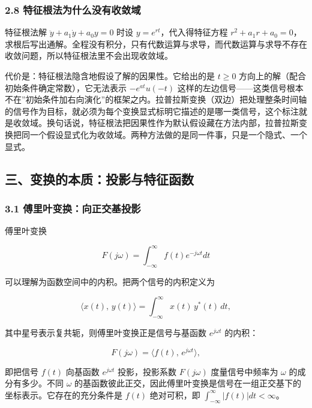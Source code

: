 \documentclass[12pt]{ctexart}
\begin{document}
\hypertarget{ux7279ux5f81ux6839ux6cd5ux4e3aux4ec0ux4e48ux6ca1ux6709ux6536ux655bux57df}{%
\subsubsection{2.8
特征根法为什么没有收敛域}\label{ux7279ux5f81ux6839ux6cd5ux4e3aux4ec0ux4e48ux6ca1ux6709ux6536ux655bux57df}}

特征根法解 \(\ddot y+a_1\dot y+a_0 y=0\) 时设
\(y=e^{rt}\)，代入得特征方程
\(r^2+a_1 r+a_0=0\)，求根后写出通解。全程没有积分，只有代数运算与求导，而代数运算与求导不存在收敛问题，所以特征根法里不会出现收敛域。

代价是：特征根法隐含地假设了解的因果性。它给出的是 \(t\ge 0\)
方向上的解（配合初始条件确定常数），它无法表示 \(-e^{at}u(-t)\)
这样的左边信号------这类信号根本不在''初始条件加右向演化''的框架之内。拉普拉斯变换（双边）把处理整条时间轴的信号作为目标，就必须为每个变换显式标明它描述的是哪一类信号，这个标注就是收敛域。换句话说，特征根法把因果性作为默认假设藏在方法内部，拉普拉斯变换把同一个假设显式化为收敛域。两种方法做的是同一件事，只是一个隐式、一个显式。

\hypertarget{ux4e09ux53d8ux6362ux7684ux672cux8d28ux6295ux5f71ux4e0eux7279ux5f81ux51fdux6570}{%
\subsection{三、变换的本质：投影与特征函数}\label{ux4e09ux53d8ux6362ux7684ux672cux8d28ux6295ux5f71ux4e0eux7279ux5f81ux51fdux6570}}

\hypertarget{ux5085ux91ccux53f6ux53d8ux6362ux5411ux6b63ux4ea4ux57faux6295ux5f71}{%
\subsubsection{3.1
傅里叶变换：向正交基投影}\label{ux5085ux91ccux53f6ux53d8ux6362ux5411ux6b63ux4ea4ux57faux6295ux5f71}}

傅里叶变换

\[
F(j\omega)=\int_{-\infty}^{\infty}f(t)e^{-j\omega t}dt
\]

可以理解为函数空间中的内积。把两个信号的内积定义为

\[
\langle x(t),\,y(t)\rangle=\int_{-\infty}^{\infty}x(t)\,y^{*}(t)\,dt,
\]

其中星号表示复共轭，则傅里叶变换正是信号与基函数 \(e^{j\omega t}\)
的内积：

\[
F(j\omega)=\langle f(t),\,e^{j\omega t}\rangle,
\]

即把信号 \(f(t)\) 向基函数 \(e^{j\omega t}\) 投影，投影系数
\(F(j\omega)\) 度量信号中频率为 \(\omega\) 的成分有多少。不同 \(\omega\)
的基函数彼此正交，因此傅里叶变换是信号在一组正交基下的坐标表示。它存在的充分条件是
\(f(t)\) 绝对可积，即 \(\int_{-\infty}^{\infty}|f(t)|dt<\infty\)。
\end{document}
